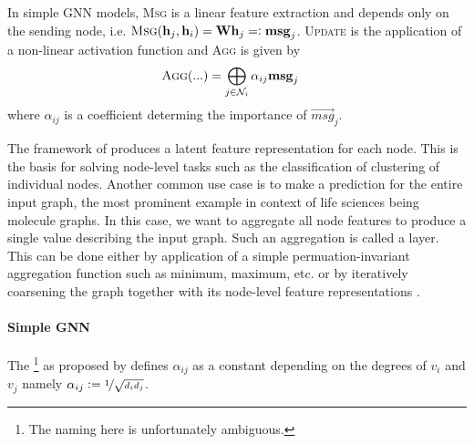 \documentclass[
	fontsize=10pt, %
	twoside=false, %
	secnumdepth=1, %
]{kaobook}
\begin{document}
In simple GNN models, \textsc{Msg} is a linear feature extraction and depends
only on the sending node, i.e. $\textsc{Msg}(\vec h_j, \vec h_i) = 
\mat W \vec h_j =: \msg_j$. 
\textsc{Update} is the application of a non-linear activation function and
\textsc{Agg} is given by
\begin{align*}
  & \textsc{Agg}(...) = \bigoplus_{j \in \mathcal{N}_i} \alpha_{ij} \vec{msg}_j
\end{align*} where $\alpha_{ij}$ is a coefficient determing the importance of
$\vec{msg}_{j}$.


The framework of  produces a latent feature
representation for each node. This is the basis for solving node-level tasks
such as the classification of clustering of individual nodes. Another common use
case is to make a prediction for the entire input graph, the most prominent
example in context of life sciences being molecule graphs. In this case, we want
to aggregate all node features to produce a single value describing the input
graph. Such an aggregation is called a  layer. This can be done
either by application of a simple permuation-invariant
aggregation function such as minimum, maximum, etc. or by iteratively coarsening
the graph together with its node-level feature representations \cite{ying_hierarchical_2019}.


\paragraph{Simple GNN} The  \footnote{The naming here is unfortunately ambiguous.} as
proposed by \citeauthor{kipf_semi-supervised_2017}
\cite{kipf_semi-supervised_2017} defines $\alpha_{ij}$ as a constant depending
on the degrees of $v_i$ and $v_j$ namely $\alpha_{ij} := \nicefrac{1}{\sqrt{d_i
    d_j}}$.
\end{document}
